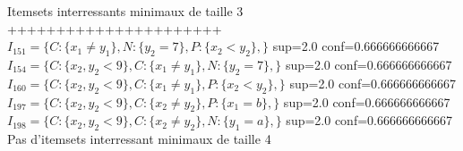 \documentclass[11pt,a4paper]{article}
\theoremstyle{definition}
\begin{document}
       Itemsets interressants minimaux de taille 3 ++++++++++++++++++++++\\
       
       $I_{151}=\{C:\{x_{1}\neq y_{1}\},N:\{y_{2}=7\},P:\{x_{2}<y_{2}\},\}$  sup=2.0 conf=0.666666666667\\
       $I_{154}=\{C:\{x_{2},y_{2}<9\},C:\{x_{1}\neq y_{1}\},N:\{y_{2}=7\},\}$  sup=2.0 conf=0.666666666667\\
       $I_{160}=\{C:\{x_{2},y_{2}<9\},C:\{x_{1}\neq y_{1}\},P:\{x_{2}<y_{2}\},\}$  sup=2.0 conf=0.666666666667\\
       $I_{197}=\{C:\{x_{2},y_{2}<9\},C:\{x_{2}\neq y_{2}\},P:\{x_{1}=b\},\}$  sup=2.0 conf=0.666666666667\\
       $I_{198}=\{C:\{x_{2},y_{2}<9\},C:\{x_{2}\neq y_{2}\},N:\{y_{1}=a\},\}$  sup=2.0 conf=0.666666666667\\

       
       Pas d'itemsets interressant minimaux de taille 4\\
       
       
       
   
   
   
   
         
         

	
\end{document}
